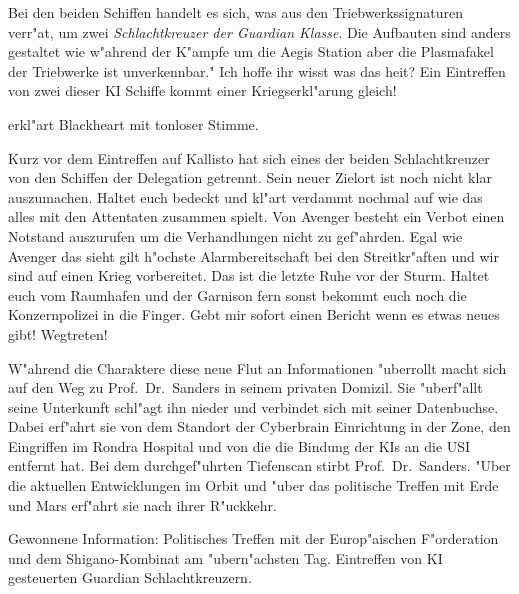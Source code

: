 \begin{speech}
	Bei den beiden Schiffen handelt es sich, was aus den Triebwerkssignaturen verr"at, um zwei \emph{Schlachtkreuzer der Guardian Klasse}. Die Aufbauten sind anders gestaltet wie w"ahrend der K"ampfe um die Aegis Station aber die Plasmafakel der Triebwerke ist unverkennbar." Ich hoffe ihr wisst was das hei\3t? Ein Eintreffen von zwei dieser KI Schiffe kommt einer Kriegserkl"arung gleich! 
\end{speech}

erkl"art Blackheart mit tonloser Stimme. 

\begin{speech}
	Kurz vor dem Eintreffen auf Kallisto hat sich eines der beiden Schlachtkreuzer von den Schiffen der Delegation getrennt. Sein neuer Zielort ist noch nicht klar auszumachen. Haltet euch bedeckt und kl"art verdammt nochmal auf wie das alles mit den Attentaten zusammen spielt. Von Avenger besteht ein Verbot einen Notstand auszurufen um die Verhandlungen nicht zu gef"ahrden. Egal wie Avenger das sieht gilt h"ochste Alarmbereitschaft bei den Streitkr"aften und wir sind auf einen Krieg vorbereitet. Das ist die letzte Ruhe vor der Sturm. Haltet euch vom Raumhafen und der Garnison fern sonst bekommt euch noch die Konzernpolizei in die Finger. Gebt mir sofort einen Bericht wenn es etwas neues gibt! Wegtreten!
\end{speech}

W"ahrend die Charaktere diese neue Flut an Informationen "uberrollt macht sich \xl{} auf den Weg zu Prof.~Dr.~Sanders in seinem privaten Domizil. Sie "uberf"allt seine Unterkunft schl"agt ihn nieder und verbindet sich mit seiner Datenbuchse. Dabei erf"ahrt sie von dem Standort der Cyberbrain Einrichtung in der Zone, den Eingriffen im Rondra Hospital und von \emph{} die die Bindung der KIs an die USI entfernt hat. Bei dem durchgef"uhrten Tiefenscan stirbt Prof.~Dr.~Sanders. "Uber die aktuellen Entwicklungen im Orbit und "uber das politische Treffen mit Erde und Mars erf"ahrt sie nach ihrer R"uckkehr.

\begin{remarks}
	Gewonnene Information: Politisches Treffen mit der Europ"aischen F"orderation und dem Shigano-Kombinat am "ubern"achsten Tag. Eintreffen von KI gesteuerten Guardian Schlachtkreuzern.
\end{remarks}
